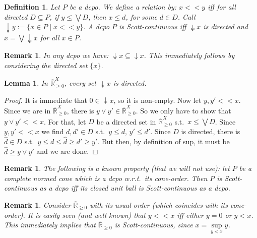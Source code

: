 \documentclass[submission,copyright,creativecommons]{eptcs}
\newtheorem{Lemma}[theorem]{Lemma}
\newtheorem{Definition}[theorem]{Definition}
\newtheorem{Remark}[theorem]{Remark}
\newcommand{\R}{\mathbb{R}}
\newcommand{\set}[1]{\{#1\}}
\begin{document}
\begin{Definition}
 Let $P$ be a dcpo.
 We define a relation by: $x<<y$ iff for all directed $D\subseteq P$, if $y\leq \bigvee D$, then $x\leq d$, for some $d\in D$.
 Call $\twoheaddownarrow y:=\set{x\in P\mid x<<y}$.
 A dcpo $P$ is \emph{Scott-continuous} iff $\twoheaddownarrow x$ is directed and $x=\bigvee\twoheaddownarrow x$ for all $x\in P$.
\end{Definition}

\begin{Remark}
 In any dcpo we have: $\twoheaddownarrow x \subseteq \downarrow x$.
 This immediately follows by considering the directed set $\set{x}$.
\end{Remark}

\begin{Lemma}\label{lm:<<dir}
 In $\overline{\R}_{\geq 0}^X$, every set $\twoheaddownarrow x$ is directed.
\end{Lemma}
\begin{proof}
 It is immediate that $0\in\twoheaddownarrow x$, so it is non-empty.
 Now let $y,y' << x$.
 Since we are in $\overline{\R}_{\geq 0}^X$, there is $y\vee y'\in\overline{\R}_{\geq 0}^X$.
 So we only have to show that $y\vee y'<<x$.
 For that, let $D$ be a directed set in $\overline{\R}_{\geq 0}^X$ s.t.\ $x\leq\bigvee D$.
 Since $y,y' << x$ we find $d,d'\in D$ s.t.\ $y\leq d$, $y'\leq d'$.
 Since $D$ is directed, there is $\hat d\in D$ s.t.\ $y\leq d\leq \hat d\geq d'\geq y'$.
 But then, by definition of sup, it must be $\hat d\geq y\vee y'$ and we are done.
\end{proof}

\begin{Remark}
 The following is a known property (that we will not use):
 let $P$ be a complete normed cone which is a dcpo w.r.t.\ its cone-order. Then $P$ is Scott-continuous as a dcpo iff its closed unit ball is Scott-continuous as a dcpo.
\end{Remark}

\begin{Remark}\label{rmk:<<R}
 Consider $\overline{\R}_{\geq 0}$ with its usual order (which coincides with its cone-order).
 It is easily seen (and well known) that $y<<x$ iff either $y=0$ or $y<x$.
 This immediately implies that $\overline{\R}_{\geq 0}$ is Scott-continuous, since $x=\sup\limits_{y<x} y$.
\end{Remark}
\end{document}
